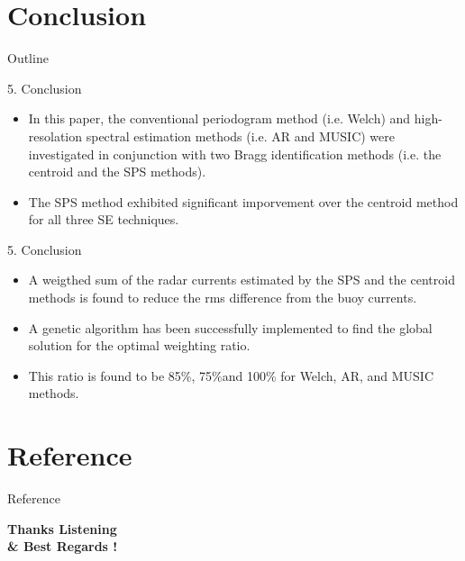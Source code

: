 \documentclass[12pt]{beamer}
\begin{document}
\section{Conclusion}
\begin{frame}{Outline}
  \transfade%
  \tableofcontents[sectionstyle=show/shaded,subsectionstyle=show/shaded] %
\end{frame}
\begin{frame}{5. Conclusion}
  \begin{itemize}
    \item In this paper, the conventional periodogram method (i.e. Welch) and high-resolation spectral estimation methods (i.e. AR and MUSIC) were investigated in conjunction with two Bragg identification methods (i.e. the centroid and the SPS methods). \newline
    \item The SPS method exhibited significant imporvement over the centroid method for all three SE techniques.
  \end{itemize}
\end{frame}
\begin{frame}{5. Conclusion}
  \begin{itemize}
    \item A weigthed sum of the radar currents estimated by the SPS and the centroid methods is found to reduce the rms difference from the buoy currents.\newline
    \item A genetic algorithm has been successfully implemented to find the global solution for the optimal weighting ratio. \newline
    \item This ratio is found to be 85\%, 75\%and 100\% for Welch, AR, and MUSIC methods.
  \end{itemize}
\end{frame}


\section{Reference}

\begin{frame}{Reference}
  
  
\end{frame}

\begin{frame}

\begin{center}
	\huge \textbf{Thanks Listening\\ \& Best Regards !}
\end{center}
	
\end{frame}
\end{document}
